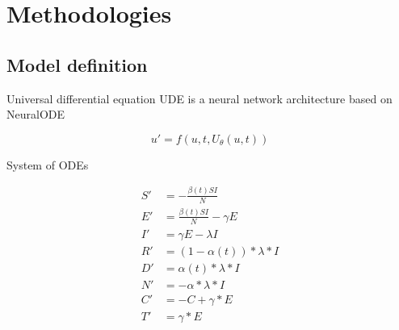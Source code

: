 \section{Methodologies}

\subsection{Model definition}

\begin{frame}{Universal differential equation}
    \gls{UDE} \cite{rackauckasUniversalDifferentialEquations2020} is a neural network architecture based on \gls{NeuralODE}
    \begin{definition}
        \begin{equation*}
            u' = f(u, t, U_\theta(u, t))
        \end{equation*}
    \end{definition}
\end{frame}

\begin{frame}{System of \glspl{ODE}}
    \begin{definition}
        \begin{equation*}
            \begin{aligned}
                S' &= - \frac{\beta(t) SI}{N} \\
                E' &= \frac{\beta(t) SI}{N} - \gamma E \\
                I' &= \gamma E - \lambda I \\
                R' &= (1 - \alpha(t)) * \lambda * I \\
                D' &= \alpha(t) * \lambda * I \\
                N' &= - \alpha * \lambda * I \\
                C' &= -C + \gamma * E \\
                T' &= \gamma * E \\
            \end{aligned}
        \end{equation*}
    \end{definition}
\end{frame}

